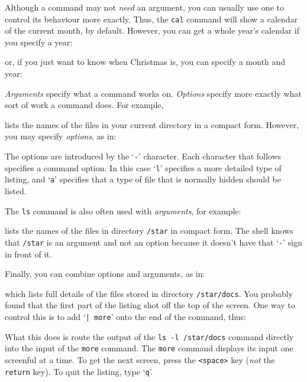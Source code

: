 \documentclass[twoside,11pt,nolof]{starlink}
\begin{document}
Although a command may not \emph{need}\/ an argument, you can usually use one to
control its behaviour more exactly.
Thus, the \texttt{cal} command will show a calendar of the current month, by
default.
However, you can get a whole year's calendar if you specify a year:
\begin{terminalv}
\end{terminalv}
or, if you just want to know when Christmas is, you can specify a month and
year:
\begin{terminalv}
\end{terminalv}

\emph{Arguments}\/ specify what a command works on.
\emph{Options}\/ specify more exactly what sort of work a command does.
For example,
\begin{terminalv}
\end{terminalv}
lists the names of the files in your current directory in a compact form.
However, you may specify \emph{options}, as in:
\begin{terminalv}
\end{terminalv}
The options are introduced by the `\texttt{-}' character.
Each character that follows specifies a command option.
In this case `\texttt{l}' specifies a more detailed type of listing, and `\texttt{a}'
specifies that a type of file that is normally hidden should be listed.

The \texttt{ls} command is also often used with \emph{arguments}, for example:
\begin{terminalv}
\end{terminalv}
lists the names of the files in directory \texttt{/star} in compact form.
The shell knows that \texttt{/star} is an argument and not an option because it
doesn't have that `\texttt{-}' sign in front of it.

Finally, you can combine options and arguments, as in:
\begin{terminalv}
\end{terminalv}
which lists full details of the files stored in directory \texttt{/star/docs}.
You probably found that the first part of the listing shot off the top of the
screen.
One way to control this is to add `\texttt{| more}' onto the end of the command,
thus:
\begin{terminalv}
\end{terminalv}
What this does is route the output of the \texttt{ls -l /star/docs} command
directly into the input of the \texttt{more} command.
The \texttt{more} command displays its input one screenful at a time.
To get the next screen, press the \texttt{<space>} key (\emph{not}\/ the
\texttt{return} key).
To quit the listing, type `\texttt{q}'.
\end{document}

